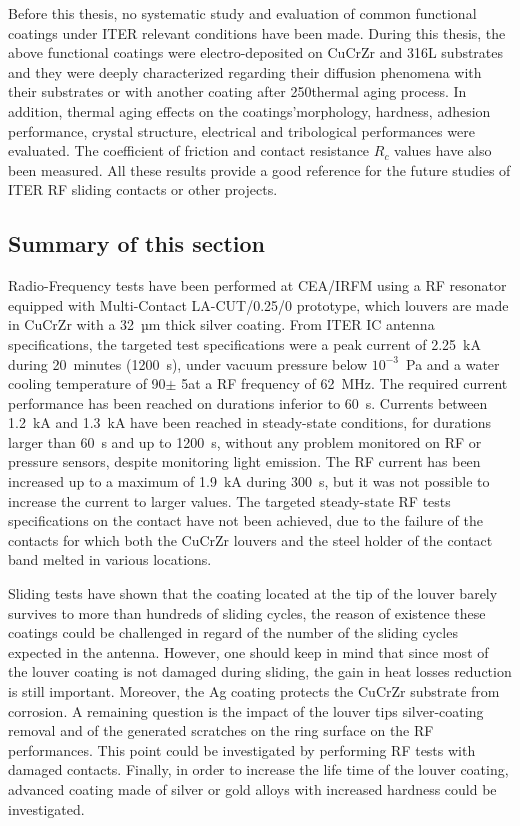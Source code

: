 {Before this thesis, no systematic study and evaluation of common functional coatings under ITER relevant conditions have been made. During this thesis, the above functional coatings were electro-deposited on CuCrZr and 316L substrates and they were deeply characterized regarding their diffusion phenomena with their substrates or with another coating after 250\degC thermal aging process. In addition, thermal aging effects on the coatings'morphology, hardness, adhesion performance, crystal structure, electrical and tribological performances were evaluated. The coefficient of friction and contact resistance $R_c$ values have also been measured. All these results provide a good reference for the future studies of ITER RF sliding contacts or other projects.


\subsection{Summary of this section}

Radio-Frequency tests have been performed at CEA/IRFM using a RF resonator equipped with Multi-Contact LA-CUT/0.25/0 prototype, which louvers are made in CuCrZr with a 32~µm thick silver coating. From ITER IC antenna specifications, the targeted test specifications were a peak current of 2.25~kA during 20~minutes (1200~s), under vacuum pressure below $10^{-3}$~Pa and a water cooling temperature of 90\degC $\pm$ 5\degC at a RF frequency of 62~MHz. The required current performance has been reached on durations inferior to 60~s. Currents between 1.2~kA and 1.3~kA have been reached in steady-state conditions, for durations larger than 60~s and up to 1200~s, without any problem monitored on RF or pressure sensors, despite monitoring light emission. The RF current has been increased up to a maximum of 1.9~kA during 300~s, but it was not possible to increase the current to larger values. The targeted steady-state RF tests specifications on the contact have not been achieved, due to the failure of the contacts for which both the CuCrZr louvers and the steel holder of the contact band melted in various locations. 

Sliding tests have shown that the coating located at the tip of the louver barely survives to more than hundreds of sliding cycles, the reason of existence these coatings could be challenged in regard of the number of the sliding cycles expected in the antenna. However, one should keep in mind that since most of the louver coating is not damaged during sliding, the gain in heat losses reduction is still important. Moreover, the Ag coating protects the CuCrZr substrate from corrosion. A remaining question is the impact of the louver tips silver-coating removal and of the generated scratches on the ring surface on the RF performances. This point could be investigated by performing RF tests with damaged contacts. Finally, in order to increase the life time of the louver coating, advanced coating made of silver or gold alloys with increased hardness could be investigated.

}
